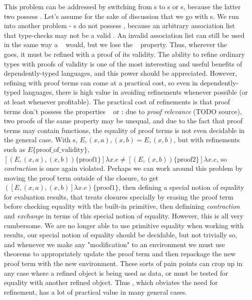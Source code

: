 {\newcommand{\refine}[2]{\ensuremath{{#1}\{\text{#2}\}}}

This problem can be addressed by switching from {\SAL}s to {\cal}s or {\fpf}s, because the latter two possess
\SemInj. Let's assume for the sake of discussion that we go with {\CAL}s. We run into another problem - {\CAL}s
do not possess \SemTot, because an arbitrary association list that type-checks may not be a valid \CAL.
An invalid association list can still be used in the same way a \SAL~ would, but we lose the
\SemInj~ property. Thus, wherever the \CAL~ goes, it must be refined with a proof of its validity. The ability
to refine ordinary types with proofs of validity is one of the most interesting and useful benefits of
dependently-typed languages, and this power should be appreciated. However, refining with proof terms can
come at a practical cost, so even in dependently-typed languages, there is high value in avoiding refinements
whenever possible (or at least whenever profitable). The practical cost of refinements is that proof terms
don't possess the properties \SemInj~ or \EqDec: due to \emph{proof relevance} (TODO source), two proofs of
the same property may be unequal, and due to the fact that proof terms may contain functions, the equality of
proof terms is not even decidable in the general case. With {\CAL}s, \mbox{$E, (x, a), (x, b) = E, (x, b)$},
but with refinements such as \refine{E}{proof\_of\_validity},
\mbox{$[\refine{(E, (x, a), (x, b))}{proof1}]\lambda x . e \ne [\refine{(E, (x, b))}{proof2}]\lambda x . e$},
so \emph{contraction} is once again violated. Perhaps we can work around this problem by moving the proof term
outside of the closure, to get \mbox{\refine{([E, (x, a), (x, b)]\lambda x . e)}{proof1}}, then defining a
special notion of equality for evaluation results, that treats closures specially by erasing the proof term
before checking equality with the built-in primitive, then definining \emph{contraction} and \emph{exchange}
in terms of this special notion of equality. However, this is all very cumbersome. We are no longer able to
use primitive equality when working with results, our special notion of equality should be decidable, but
not trivially so, and whenever we make any "modification" to an environment we must use theorems
to appropriately update the proof term and then repackage the new proof term with the new environment.
These sorts of pain points can crop up in any case where a refined object is being used as data, or must be
tested for equality with another refined object. Thus \SemTot, which obviates the need for refinement, has
a lot of practical value in many general cases.

}
